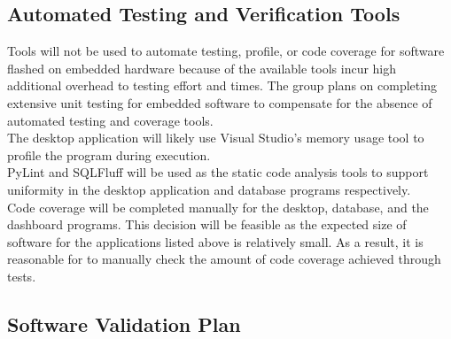 \documentclass[12pt, titlepage]{article}
\begin{document}
\subsection{Automated Testing and Verification Tools}


  Tools will not be used to automate testing, profile, or code coverage for software flashed on embedded hardware because of the available tools incur high additional overhead to testing effort and times. The group plans on completing extensive unit testing for embedded software to compensate for the absence of automated testing and coverage tools.\\

  The desktop application will likely use Visual Studio's memory usage tool to profile the program during execution.\\

  PyLint and SQLFluff will be used as the static code analysis tools to support uniformity in the desktop application and database programs respectively.\\

  Code coverage will be completed manually for the desktop, database, and the dashboard programs. This decision will be feasible as the expected size of software for the applications listed above is relatively small. As a result, it is reasonable for to manually check the amount of code coverage achieved through tests.\\


\subsection{Software Validation Plan}

\end{document}
